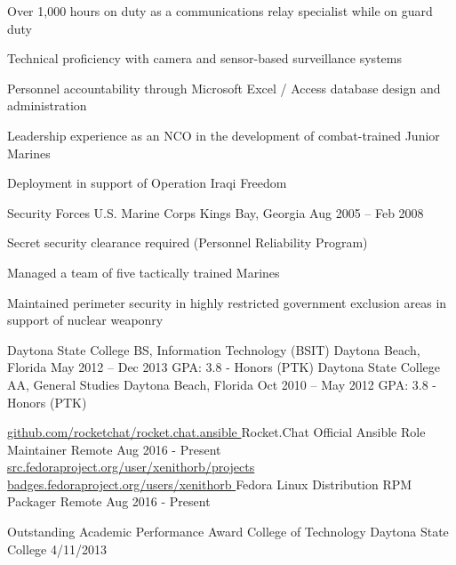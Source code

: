 \documentclass[]{awesome-cv}
\begin{document}
\begin{cventries}
{\begin{cvitems}
		\item {Over 1,000 hours on duty as a communications relay specialist while on guard duty}
		\item {Technical proficiency with camera and sensor-based surveillance systems}
		\item {Personnel accountability through Microsoft Excel / Access database design and administration}
		\item {Leadership experience as an NCO in the development of combat-trained Junior Marines}
		\item {Deployment in support of Operation Iraqi Freedom}
		\end{cvitems}}
	\cventry
	{Security Forces}
	{U.S. Marine Corps}
	{King\textquotesingle{}s Bay, Georgia}
	{Aug 2005 – Feb 2008}
	{\begin{cvitems}
		\item {Secret security clearance required (Personnel Reliability Program)}
		\item {Managed a team of five tactically trained Marines}
		\item {Maintained perimeter security in highly restricted government exclusion areas in support of nuclear weaponry}
		\end{cvitems}}
\end{cventries}



\pagebreak
\begin{cventries}
	\cventry
	{Daytona State College}
	{BS, Information Technology (BSIT)}
	{Daytona Beach, Florida}
	{May 2012 – Dec 2013}
	{GPA: 3.8 - Honors (PTK)}
	\cventry
	{Daytona State College}
	{AA, General Studies}
	{Daytona Beach, Florida}
	{Oct 2010 – May 2012}
	{GPA: 3.8 - Honors (PTK)}
\end{cventries}

\begin{cventries}
	\cventry
	{ 
		\href{https://github.com/rocketchat/rocket.chat.ansible}{ github.com/rocketchat/rocket.chat.ansible }
	}
	{Rocket.Chat Official Ansible Role Maintainer}
	{Remote}
	{Aug 2016 - Present}{}
	\cventry
	{
		\href{https://src.fedoraproject.org/user/xenithorb/projects}{ src.fedoraproject.org/user/xenithorb/projects }
		\href{https://badges.fedoraproject.org/user/xenithorb}{ badges.fedoraproject.org/users/xenithorb }
	}
	{Fedora Linux Distribution RPM Packager}
	{Remote}
	{Aug 2016 - Present}{}
\end{cventries}

\begin{cvhonors}
	\cvhonor
		{Outstanding Academic Performance Award}
		{College of Technology}
		{Daytona State College}
		{4/11/2013}
\end{cvhonors} 
\ 
\end{document}
